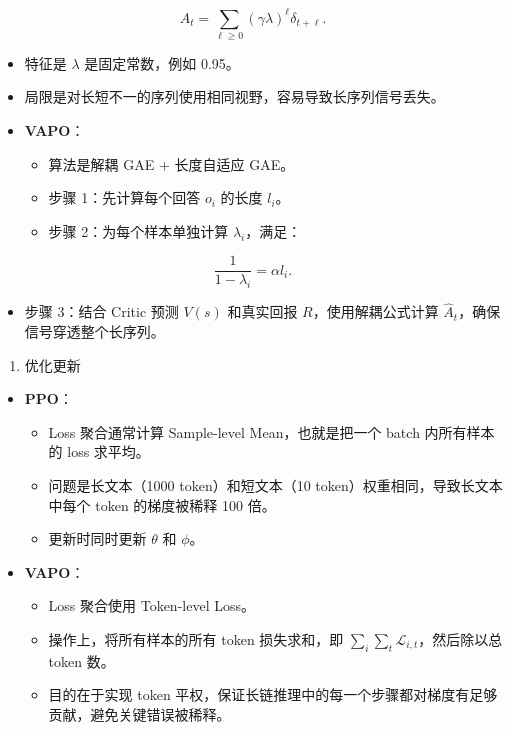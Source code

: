 \[
A_t
=
\sum_{\ell\ge 0}(\gamma\lambda)^\ell\delta_{t+\ell}.
\]

\begin{itemize}
\item
  特征是 \(\lambda\) 是固定常数，例如 0.95。
\item
  局限是对长短不一的序列使用相同视野，容易导致长序列信号丢失。
\item
  \textbf{VAPO}：

  \begin{itemize}
  \tightlist
  \item
    算法是解耦 GAE + 长度自适应 GAE。
  \item
    步骤 1：先计算每个回答 \(o_i\) 的长度 \(l_i\)。
  \item
    步骤 2：为每个样本单独计算 \(\lambda_i\)，满足：
  \end{itemize}
\end{itemize}

\[
\frac{1}{1-\lambda_i}
=
\alpha l_i.
\]

\begin{itemize}
\tightlist
\item
  步骤 3：结合 Critic 预测 \(V(s)\) 和真实回报 \(R\)，使用解耦公式计算 \(\hat{A}_t\)，确保信号穿透整个长序列。
\end{itemize}

\begin{enumerate}
\def\labelenumi{\arabic{enumi}.}
\setcounter{enumi}{3}
\tightlist
\item
  优化更新
\end{enumerate}

\begin{itemize}
\tightlist
\item
  \textbf{PPO}：

  \begin{itemize}
  \tightlist
  \item
    Loss 聚合通常计算 Sample-level Mean，也就是把一个 batch 内所有样本的 loss 求平均。
  \item
    问题是长文本（1000 token）和短文本（10 token）权重相同，导致长文本中每个 token 的梯度被稀释 100 倍。
  \item
    更新时同时更新 \(\theta\) 和 \(\phi\)。
  \end{itemize}
\item
  \textbf{VAPO}：

  \begin{itemize}
  \tightlist
  \item
    Loss 聚合使用 Token-level Loss。
  \item
    操作上，将所有样本的所有 token 损失求和，即 \(\sum_i\sum_t \mathcal{L}_{i,t}\)，然后除以总 token 数。
  \item
    目的在于实现 token 平权，保证长链推理中的每一个步骤都对梯度有足够贡献，避免关键错误被稀释。
  \end{itemize}
\end{itemize}

